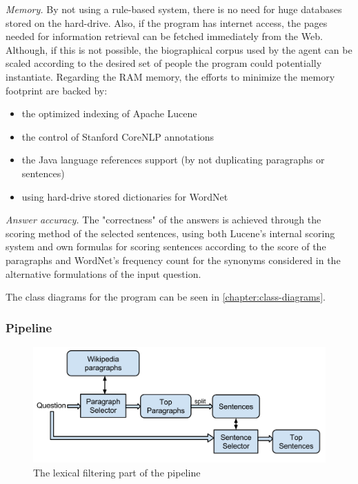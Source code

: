 {\em Memory.} By not using a rule-based system, there is no need for huge databases stored on the hard-drive. Also, if the program has internet access, the pages needed for information retrieval can be fetched immediately from the Web. Although, if this is not possible, the biographical corpus used by the agent can be scaled according to the desired set of people the program could potentially instantiate. Regarding the RAM memory, the efforts to minimize the memory footprint are backed by:

\begin{itemize}
  \item the optimized indexing of Apache Lucene
  \item the control of Stanford CoreNLP annotations
  \item the Java language references support (by not duplicating paragraphs or sentences)
  \item using hard-drive stored dictionaries for WordNet
\end{itemize}

{\em Answer accuracy.} The "correctness" of the answers is achieved through the scoring method of the selected sentences, using both Lucene's internal scoring system and own formulas for scoring sentences according to the score of the paragraphs and WordNet's frequency count for the synonyms considered in the alternative formulations of the input question.

The class diagrams for the program can be seen in \autoref{chapter:class-diagrams}.

\subsubsection{Pipeline}
\label{sub-sub-sec:pipeline}

\begin{figure}[htb]
  \centering
  \captionsetup{justification=centering}
  \includegraphics[width=\textwidth]{src/img/pipeline-lexical.png}
  \caption{The lexical filtering part of the pipeline}
  \label{fig:pipeline-lexical}
\end{figure}


